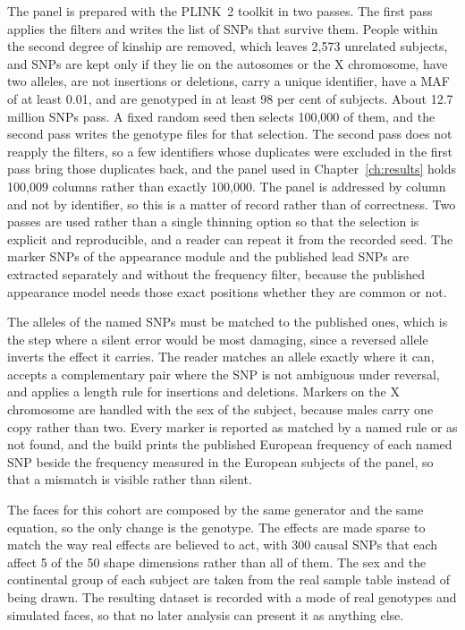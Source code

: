 The panel is prepared with the PLINK~2 toolkit in two passes. The first pass applies the filters and writes the list of SNPs that survive them. People within the second degree of kinship are removed, which leaves 2{,}573 unrelated subjects, and SNPs are kept only if they lie on the autosomes or the X chromosome, have two alleles, are not insertions or deletions, carry a unique identifier, have a MAF of at least 0.01, and are genotyped in at least 98 per cent of subjects. About 12.7 million SNPs pass. A fixed random seed then selects 100{,}000 of them, and the second pass writes the genotype files for that selection. The second pass does not reapply the filters, so a few identifiers whose duplicates were excluded in the first pass bring those duplicates back, and the panel used in Chapter~\ref{ch:results} holds 100{,}009 columns rather than exactly 100{,}000. The panel is addressed by column and not by identifier, so this is a matter of record rather than of correctness. Two passes are used rather than a single thinning option so that the selection is explicit and reproducible, and a reader can repeat it from the recorded seed. The marker SNPs of the appearance module and the published lead SNPs are extracted separately and without the frequency filter, because the published appearance model needs those exact positions whether they are common or not.

The alleles of the named SNPs must be matched to the published ones, which is the step where a silent error would be most damaging, since a reversed allele inverts the effect it carries. The reader matches an allele exactly where it can, accepts a complementary pair where the SNP is not ambiguous under reversal, and applies a length rule for insertions and deletions. Markers on the X chromosome are handled with the sex of the subject, because males carry one copy rather than two. Every marker is reported as matched by a named rule or as not found, and the build prints the published European frequency of each named SNP beside the frequency measured in the European subjects of the panel, so that a mismatch is visible rather than silent.

The faces for this cohort are composed by the same generator and the same equation, so the only change is the genotype. The effects are made sparse to match the way real effects are believed to act, with 300 causal SNPs that each affect 5 of the 50 shape dimensions rather than all of them. The sex and the continental group of each subject are taken from the real sample table instead of being drawn. The resulting dataset is recorded with a mode of real genotypes and simulated faces, so that no later analysis can present it as anything else.

